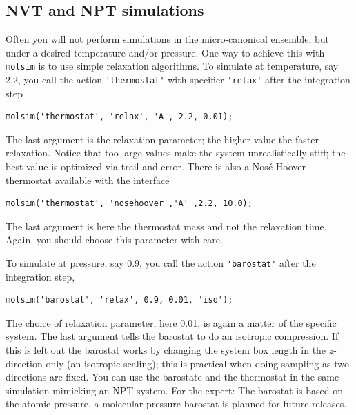 \documentclass[11pt]{article}
\begin{document}
\subsection{NVT and NPT simulations}
Often you will not perform simulations in the micro-canonical ensemble, but
under a desired temperature and/or pressure. One way to achieve this with
\verb!molsim! is to use simple relaxation algorithms. To simulate at
temperature, say 2.2, you call the action \verb!'thermostat'! with specifier
\verb!'relax'! after the integration step
\begin{verbatim}
molsim('thermostat', 'relax', 'A', 2.2, 0.01);
\end{verbatim}
The last argument is the relaxation parameter; the higher value the faster
relaxation. Notice that too large values make the system unrealistically
stiff; the best value is optimized via trail-and-error. There is also a
Nos\'{e}-Hoover thermostat available with the interface
\begin{verbatim}
molsim('thermostat', 'nosehoover','A' ,2.2, 10.0);
\end{verbatim}
The last argument is here the thermostat mass and not the relaxation
time. Again, you should choose this parameter with care.

To simulate at pressure, say 0.9, you call the action \verb!'barostat'! after
the integration step,
\begin{verbatim}
molsim('barostat', 'relax', 0.9, 0.01, 'iso');
\end{verbatim}
The choice of relaxation parameter, here 0.01, is again a matter of the specific
system. The last argument tells the barostat to do an isotropic compression. If
this is left out the barostat works by changing the system box length in the
$z$-direction only (an-isotropic scaling); this is practical when doing sampling
as two directions are fixed. You can use the barostate and the thermostat
in the same simulation mimicking an NPT system. For the expert: The barostat is
based on the atomic pressure, a molecular pressure barostat is planned for
future releases.  
\end{document}
